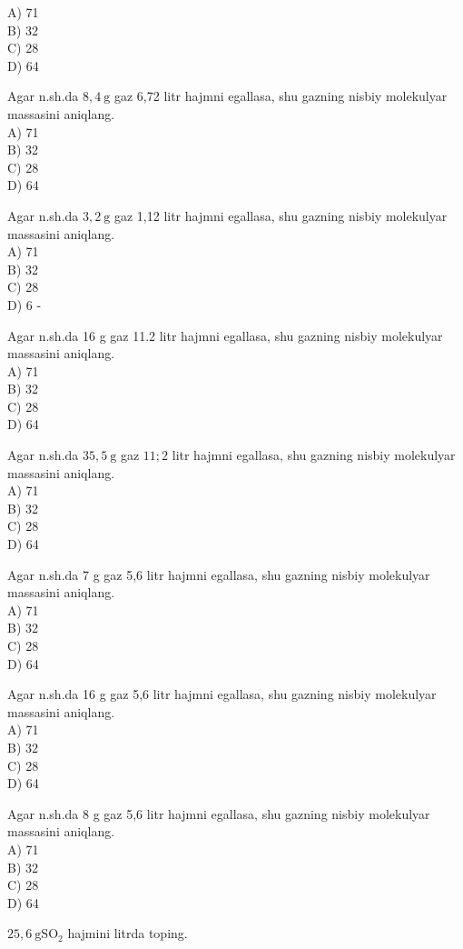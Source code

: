 A) 71\\
B) 32\\
C) 28\\
D) 64
  \item Agar n.sh.da $8,4 \mathrm{~g}$ gaz 6,72 litr hajmni egallasa, shu gazning nisbiy molekulyar massasini aniqlang.\\
A) 71\\
B) 32\\
C) 28\\
D) 64
  \item Agar n.sh.da $3,2 \mathrm{~g}$ gaz 1,12 litr hajmni egallasa, shu gazning nisbiy molekulyar massasini aniqlang.\\
A) 71\\
B) 32\\
C) 28\\
D) 6 -
  \item Agar n.sh.da 16 g gaz 11.2 litr hajmni egallasa, shu gazning nisbiy molekulyar massasini aniqlang.\\
A) 71\\
B) 32\\
C) 28\\
D) 64
  \item Agar n.sh.da $35,5 \mathrm{~g}$ gaz $11 ; 2$ litr hajmni egallasa, shu gazning nisbiy molekulyar massasini aniqlang.\\
A) 71\\
B) 32\\
C) 28\\
D) 64
  \item Agar n.sh.da 7 g gaz 5,6 litr hajmni egallasa, shu gazning nisbiy molekulyar massasini aniqlang.\\
A) 71\\
B) 32\\
C) 28\\
D) 64
  \item Agar n.sh.da 16 g gaz 5,6 litr hajmni egallasa, shu gazning nisbiy molekulyar massasini aniqlang.\\
A) 71\\
B) 32\\
C) 28\\
D) 64
  \item Agar n.sh.da 8 g gaz 5,6 litr hajmni egallasa, shu gazning nisbiy molekulyar massasini aniqlang.\\
A) 71\\
B) 32\\
C) 28\\
D) 64
  \item $25,6 \mathrm{~g} \mathrm{SO}_{2}$ hajmini litrda toping.\\
